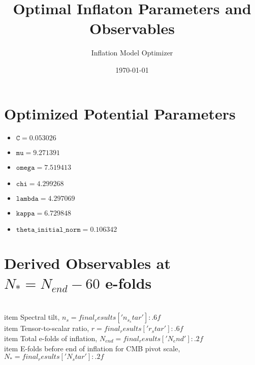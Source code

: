 \documentclass{article}
\title{Optimal Inflaton Parameters and Observables}
\date{\today}
\author{Inflation Model Optimizer}
\begin{document}
\maketitle
\section*{Optimized Potential Parameters}
\begin{itemize}
  \item $\texttt{C} = 0.053026$
  \item $\texttt{mu} = 9.271391$
  \item $\texttt{omega} = 7.519413$
  \item $\texttt{chi} = 4.299268$
  \item $\texttt{lambda} = 4.297069$
  \item $\texttt{kappa} = 6.729848$
  \item $\texttt{theta\_initial\_norm} = 0.106342$
\end{itemize}
\section*{Derived Observables at $N_* = N_{{end}} - 60$ e-folds}
\begin{itemize}
  \\item Spectral tilt, $n_s = {final_results['n_s_star']:.6f}$\n  \\item Tensor-to-scalar ratio, $r = {final_results['r_star']:.6f}$\n  \\item Total e-folds of inflation, $N_{{end}} = {final_results['N_end']:.2f}$\n  \\item E-folds before end of inflation for CMB pivot scale, $N_* = {final_results['N_star']:.2f}$\n\end{itemize}
\end{document}
